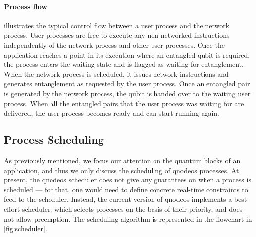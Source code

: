 \paragraph{Process flow}

 illustrates the typical control flow between a user process and the network
process. User processes are free to execute any non-networked instructions independently of the
network process and other user processes. Once the application reaches a point in its execution
where an entangled qubit is required, the process enters the waiting state and is flagged as waiting
for entanglement. When the network process is scheduled, it issues network instructions and
generates entanglement as requested by the user process. Once an entangled pair is generated by the
network process, the qubit is handed over to the waiting user process. When all the entangled pairs
that the user process was waiting for are delivered, the user process becomes ready and can start
running again.

\subsection{Process Scheduling}

As previously mentioned, we focus our attention on the quantum blocks of an application, and thus we
only discuss the scheduling of \acrshort{qnodeos} processes. At present, the \acrshort{qnodeos}
scheduler does not give any guarantees on when a process is scheduled --- for that, one would need
to define concrete real-time constraints to feed to the scheduler. Instead, the current version of
\acrshort{qnodeos} implements a best-effort scheduler, which selects processes on the basis of their
priority, and does not allow preemption. The scheduling algorithm is represented in the flowchart in
\cref{fig:scheduler}.

